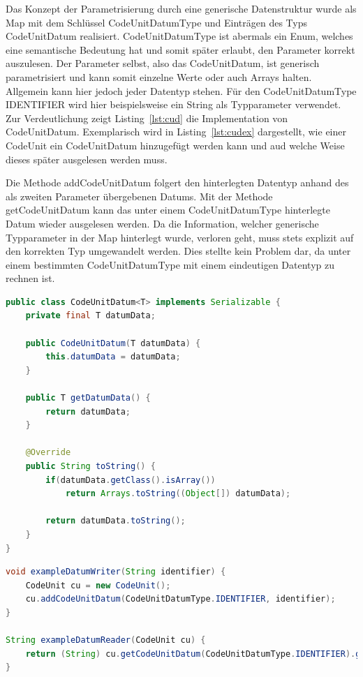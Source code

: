 \documentclass[12pt,oneside,a4paper,parskip]{scrbook}
\begin{document}
Das Konzept der Parametrisierung durch eine generische Datenstruktur wurde als Map mit dem Schlüssel CodeUnitDatumType und Einträgen des Typs CodeUnitDatum realisiert. CodeUnitDatumType ist abermals ein Enum, welches eine semantische Bedeutung hat und somit später erlaubt, den Parameter korrekt auszulesen. Der Parameter selbst, also das CodeUnitDatum, ist generisch parametrisiert und kann somit einzelne Werte oder auch Arrays halten. Allgemein kann hier jedoch jeder Datentyp stehen. Für den CodeUnitDatumType IDENTIFIER wird hier beispielsweise ein String als Typparameter verwendet. Zur Verdeutlichung zeigt Listing~\ref{lst:cud} die Implementation von CodeUnitDatum. Exemplarisch wird in Listing~\ref{lst:cudex} dargestellt, wie einer CodeUnit ein CodeUnitDatum hinzugefügt werden kann und aud welche Weise dieses später ausgelesen werden muss.

Die Methode addCodeUnitDatum folgert den hinterlegten Datentyp anhand des als zweiten Parameter übergebenen Datums. Mit der Methode getCodeUnitDatum kann das unter einem CodeUnitDatumType hinterlegte Datum wieder ausgelesen werden. Da die Information, welcher generische Typparameter in der Map hinterlegt wurde, verloren geht, muss stets explizit auf den korrekten Typ umgewandelt werden. Dies stellte kein Problem dar, da unter einem bestimmten CodeUnitDatumType mit einem eindeutigen Datentyp zu rechnen ist.

\begin{lstlisting}[label=lst:cud,
language=java,
firstnumber=1,
caption=Implementation der Klasse CodeUnitDatum.]
public class CodeUnitDatum<T> implements Serializable {
	private final T datumData;
	
	public CodeUnitDatum(T datumData) {
		this.datumData = datumData;
	}
	
	public T getDatumData() {
		return datumData;
	}
	
	@Override
	public String toString() {
		if(datumData.getClass().isArray())
			return Arrays.toString((Object[]) datumData);
		
		return datumData.toString();
	}
}
\end{lstlisting}

\begin{lstlisting}[label=lst:cudex,
language=java,
firstnumber=1,
caption=Beispiel zum hinterlegen und auslesen eines CodeUnitDatums.]
void exampleDatumWriter(String identifier) {
	CodeUnit cu = new CodeUnit();
	cu.addCodeUnitDatum(CodeUnitDatumType.IDENTIFIER, identifier);
}
	
String exampleDatumReader(CodeUnit cu) {
	return (String) cu.getCodeUnitDatum(CodeUnitDatumType.IDENTIFIER).getDatumData();
}
\end{lstlisting}
\end{document}
